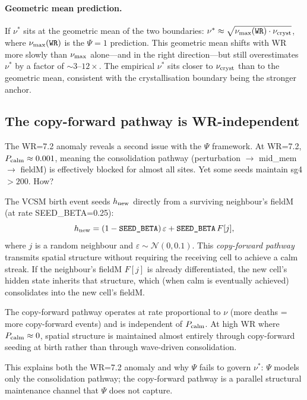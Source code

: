\documentclass[11pt]{article}
\begin{document}
\paragraph{Geometric mean prediction.}
If $\nu^*$ sits at the geometric mean of the two boundaries:
$\nu^* \approx \sqrt{\nu_{\rm max}(\texttt{WR}) \cdot \nu_{\rm cryst}}$,
where $\nu_{\rm max}(\texttt{WR})$ is the $\Psi=1$ prediction.
This geometric mean shifts with WR more slowly than $\nu_{\rm max}$ alone---and
in the right direction---but still overestimates $\nu^*$ by a factor of
$\sim3$--$12\times$.
The empirical $\nu^*$ sits closer to $\nu_{\rm cryst}$ than to the geometric mean,
consistent with the crystallisation boundary being the stronger anchor.

\subsection{The copy-forward pathway is WR-independent}
\label{sec:mechanism}

The WR=7.2 anomaly reveals a second issue with the $\Psi$ framework.
At WR=7.2, $P_{\rm calm} \approx 0.001$, meaning the consolidation pathway
(perturbation $\to$ mid\_mem $\to$ fieldM) is effectively blocked for almost all
sites.
Yet some seeds maintain sg4 $> 200$.
How?

The VCSM birth event seeds $h_{\rm new}$ directly from a surviving neighbour's
fieldM (at rate SEED\_BETA=0.25):
\[
  h_{\rm new} = (1 - \texttt{SEED\_BETA})\,\varepsilon + \texttt{SEED\_BETA}\,F[j],
\]
where $j$ is a random neighbour and $\varepsilon \sim \mathcal{N}(0, 0.1)$.
This \emph{copy-forward pathway} transmits spatial structure without requiring
the receiving cell to achieve a calm streak.
If the neighbour's fieldM $F[j]$ is already differentiated, the new cell's
hidden state inherits that structure, which (when calm is eventually achieved)
consolidates into the new cell's fieldM.

The copy-forward pathway operates at rate proportional to $\nu$ (more deaths =
more copy-forward events) and is independent of $P_{\rm calm}$.
At high WR where $P_{\rm calm} \approx 0$, spatial structure is maintained
almost entirely through copy-forward seeding at birth rather than through
wave-driven consolidation.

This explains both the WR=7.2 anomaly and why $\Psi$ fails to govern $\nu^*$:
$\Psi$ models only the consolidation pathway; the copy-forward pathway is a
parallel structural maintenance channel that $\Psi$ does not capture.
\end{document}
